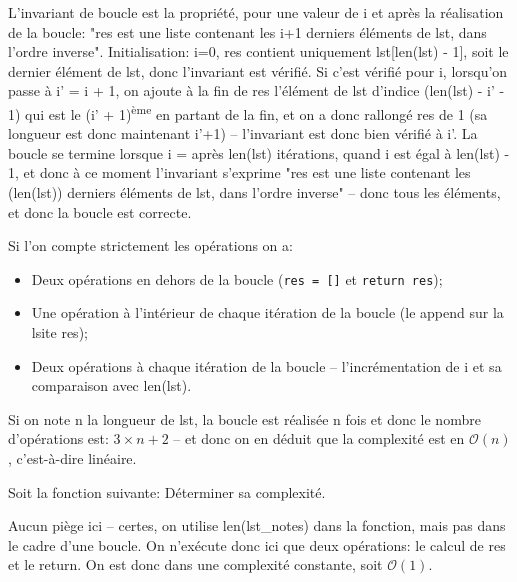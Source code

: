 \documentclass[12pt]{article}
\begin{document}
	\begin{MaReponse}
		\begin{alphenum}
			\item L'invariant de boucle est la propriété, pour une valeur de i et après la réalisation de la boucle: "res est une liste contenant les i+1 derniers éléments de lst, dans l'ordre inverse". Initialisation: i=0, res contient uniquement lst[len(lst) - 1], soit le dernier élément de lst, donc l'invariant est vérifié. Si c'est vérifié pour i, lorsqu'on passe à i' = i + 1, on ajoute à la fin de res l'élément de lst d'indice (len(lst) - i' - 1) qui est le (i' + 1)\textsuperscript{ème} en partant de la fin, et on a donc rallongé res de 1 (sa longueur est donc maintenant i'+1) -- l'invariant est donc bien vérifié à i'. La boucle se termine lorsque i =  après len(lst) itérations, quand i est égal à len(lst) - 1, et donc à ce moment l'invariant s'exprime "res est une liste contenant les (len(lst)) derniers éléments de lst, dans l'ordre inverse" -- donc tous les éléments, et donc la boucle est correcte.
			\item Si l'on compte strictement les opérations on a:
			\begin{itemize}
				\item Deux opérations en dehors de la boucle (\texttt{res = []} et \texttt{return res});
				\item Une opération à l'intérieur de chaque itération de la boucle (le append sur la lsite res);
				\item Deux opérations à chaque itération de la boucle -- l'incrémentation de i et sa comparaison avec len(lst).
			\end{itemize}
			Si on note n la longueur de lst, la boucle est réalisée n fois et donc le nombre d'opérations est: $3 \times n + 2$ -- et donc on en déduit que la complexité est en $\mathcal{O}(n)$, c'est-à-dire linéaire.
		\end{alphenum}
	\end{MaReponse}

		\begin{MonExo}
		Soit la fonction suivante:
		\MonPython{Exos_011_NotePonderee.py}
		Déterminer sa complexité.
	\end{MonExo}
	
	\begin{MaReponse}
		Aucun piège ici -- certes, on utilise len(lst\_notes) dans la fonction, mais pas dans le cadre d'une boucle. On n'exécute donc ici que deux opérations: le calcul de res et le return. On est donc dans une complexité constante, soit $\mathcal{O}(1)$.
	\end{MaReponse}
	
\end{document}
